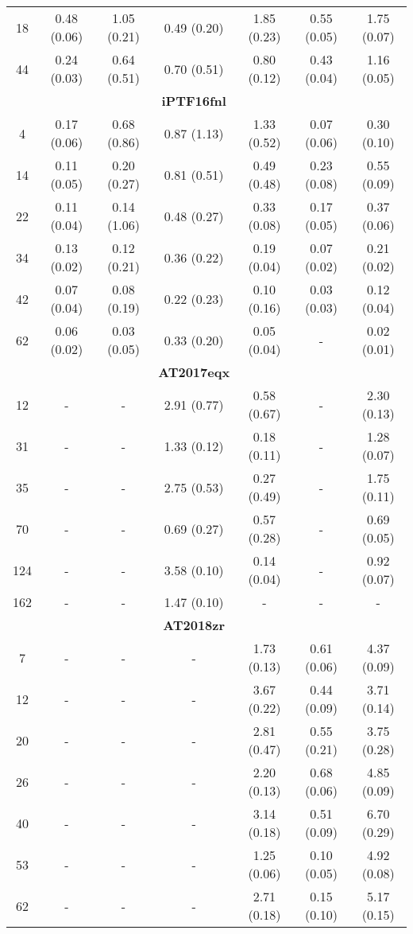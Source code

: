 \documentclass[structabstract]{aa}
\begin{document}
\begin{small}
\begin{longtable}{c c c c c c c}
18	&	0.48 (0.06)	&	1.05 (0.21)	&	0.49 (0.20)	&	1.85 (0.23)	&	0.55 (0.05)	&	1.75 (0.07)  \\
44	&	0.24 (0.03)	&	0.64 (0.51)	&	0.70 (0.51)	&	0.80 (0.12)	&	0.43 (0.04)	&	1.16 (0.05)  \\ \hline
	&		&		&	\textbf{iPTF16fnl}	&		&		&	\\ \hline
4	&	0.17 (0.06)	&	0.68 (0.86)	&	0.87 (1.13)	&	1.33 (0.52)	&	0.07 (0.06)	&	0.30 (0.10)  \\
14	&	0.11 (0.05)	&	0.20 (0.27)	&	0.81 (0.51)	&	0.49 (0.48)	&	0.23 (0.08)	&	0.55 (0.09)  \\
22	&	0.11 (0.04)	&	0.14 (1.06)	&	0.48 (0.27)	&	0.33 (0.08)	&	0.17 (0.05)	&	0.37 (0.06)  \\
34	&	0.13 (0.02)	&	0.12 (0.21)	&	0.36 (0.22)	&	0.19 (0.04)	&	0.07 (0.02)	&	0.21 (0.02)  \\
42	&	0.07 (0.04)	&	0.08 (0.19)	&	0.22 (0.23)	&	0.10 (0.16)	&	0.03 (0.03)	&	0.12 (0.04)  \\
62	&	0.06 (0.02)	&	0.03 (0.05)	&	0.33 (0.20)	&	0.05 (0.04)	&	-	&	0.02 (0.01)  \\ \hline
	&		&		&	\textbf{AT2017eqx}	&		&		&	\\ \hline
12	&	-	&	-	&	2.91 (0.77)	&	0.58 (0.67)	&	-		&	2.30 (0.13)  \\
31	&	-	&	-	&	1.33 (0.12)	&	0.18 (0.11)	&	-		&	1.28 (0.07)  \\
35	&	-	&	-	&	2.75 (0.53)	&	0.27 (0.49)	&	-		&	1.75 (0.11)  \\
70	&	-	&	-	&	0.69 (0.27)	&	0.57 (0.28)	&	-		&	0.69 (0.05)  \\
124	&	-	&	-	&	3.58 (0.10)	&	0.14 (0.04)	&	-		&	0.92 (0.07)  \\
162	&	-	&	-	&	1.47 (0.10)	&	-			&	-       &   -            \\ \hline
	&		&		&	\textbf{AT2018zr}	&		&		&	\\ \hline
7	&	-	&	-	&	-	&	1.73 (0.13)	&	0.61 (0.06)	&	4.37 (0.09)  \\
12	&	-	&	-	&	-	&	3.67 (0.22)	&	0.44 (0.09)	&	3.71 (0.14)  \\
20	&	-	&	-	&	-	&	2.81 (0.47)	&	0.55 (0.21)	&	3.75 (0.28)  \\
26	&	-	&	-	&	-	&	2.20 (0.13)	&	0.68 (0.06)	&	4.85 (0.09)  \\
40	&	-	&	-	&	-	&	3.14 (0.18)	&	0.51 (0.09)	&	6.70 (0.29)  \\
53	&	-	&	-	&	-	&	1.25 (0.06)	&	0.10 (0.05)	&	4.92 (0.08)  \\
62	&	-	&	-	&	-	&	2.71 (0.18)	&	0.15 (0.10)	&	5.17 (0.15)  \\ \hline

\end{longtable}
\end{small}
\end{document}
